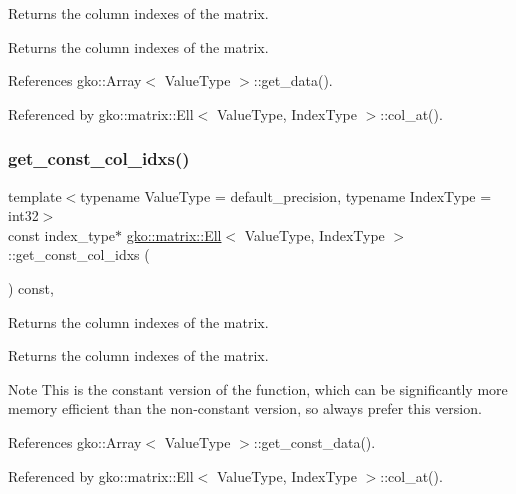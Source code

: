 Returns the column indexes of the matrix. 

\begin{DoxyReturn}{Returns}
the column indexes of the matrix. 
\end{DoxyReturn}


References gko\+::\+Array$<$ Value\+Type $>$\+::get\+\_\+data().



Referenced by gko\+::matrix\+::\+Ell$<$ Value\+Type, Index\+Type $>$\+::col\+\_\+at().

\mbox{\label{classgko_1_1matrix_1_1Ell_addb3c84f52b090c75f519833fb379cef}} 
\subsubsection{\texorpdfstring{get\+\_\+const\+\_\+col\+\_\+idxs()}{get\_const\_col\_idxs()}}
{\footnotesize\ttfamily template$<$typename Value\+Type = default\+\_\+precision, typename Index\+Type = int32$>$ \\
const index\+\_\+type$\ast$ \hyperlink{classgko_1_1matrix_1_1Ell}{gko\+::matrix\+::\+Ell}$<$ Value\+Type, Index\+Type $>$\+::get\+\_\+const\+\_\+col\+\_\+idxs (\begin{DoxyParamCaption}{ }\end{DoxyParamCaption}) const\hspace{0.3cm}{\ttfamily [inline]}, {\ttfamily [noexcept]}}



Returns the column indexes of the matrix. 

\begin{DoxyReturn}{Returns}
the column indexes of the matrix.
\end{DoxyReturn}
\begin{DoxyNote}{Note}
This is the constant version of the function, which can be significantly more memory efficient than the non-\/constant version, so always prefer this version. 
\end{DoxyNote}


References gko\+::\+Array$<$ Value\+Type $>$\+::get\+\_\+const\+\_\+data().



Referenced by gko\+::matrix\+::\+Ell$<$ Value\+Type, Index\+Type $>$\+::col\+\_\+at().


